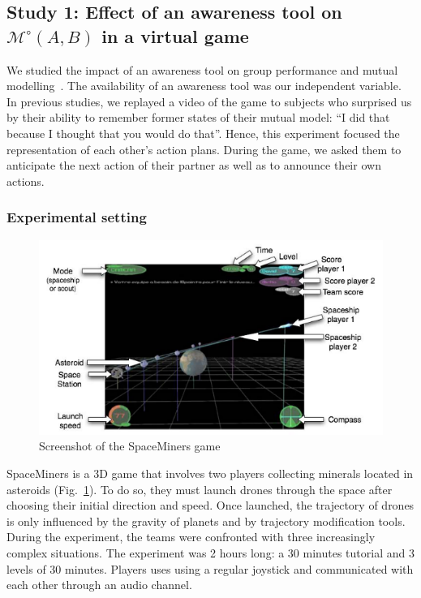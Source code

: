 \documentclass[natbib]{svjour3}
\newcommand{\gModel}[2]{{$\mathcal{M}^{\circ}(#1, #2)$}}
\begin{document}
\subsection{{\bf Study 1}: Effect of an awareness tool on \gModel{A}{B} in a virtual
game}

We studied the impact of an awareness tool on group performance and mutual
modelling~\citep{nova2007collaboration}. The availability
of an awareness tool was our independent variable. In previous studies, we
replayed a video of the game to subjects who surprised us by their ability to
remember former states of their mutual model: ``I did that because I thought that
you would do that''. Hence, this experiment focused the representation of each
other's action plans. During the game, we asked them to anticipate the next
action of their partner as well as to announce their own actions.

\subsubsection*{Experimental setting}

\begin{figure}
        \centering
        \includegraphics[width=\textwidth]{image4.png}
        \caption{Screenshot of the {\sc SpaceMiners} game}
        \label{study1:spaceminer}
\end{figure}


{\sc SpaceMiners} is a 3D game that involves two players collecting minerals located
in asteroids (Fig.~\ref{study1:spaceminer}). To do so, they must launch drones through
the space after choosing their initial direction and speed. Once launched, the
trajectory of drones is only influenced by the gravity of planets and by
trajectory modification tools.  During the experiment, the teams were confronted
with three increasingly complex situations. The experiment was 2 hours long: a
30 minutes tutorial and 3 levels of 30 minutes. Players uses using a regular
joystick and communicated with each other through an audio channel.
\end{document}
